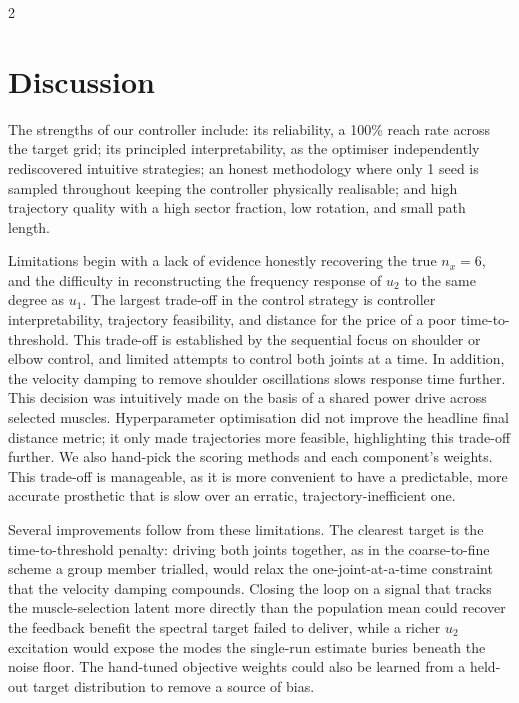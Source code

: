 \documentclass[a4paper, 10pt]{article}
\begin{document}
\begin{multicols*}{2}

  \section*{Discussion}

  The strengths of our controller include: its reliability, a 100\% reach rate
  across the target grid; its principled interpretability, as the optimiser
  independently rediscovered intuitive strategies; an honest methodology where
  only 1 seed is sampled throughout keeping the controller physically
  realisable; and high trajectory quality with a high sector fraction, low
  rotation, and small path length.

  Limitations begin with a lack of evidence honestly recovering the true
  $n_x=6$, and the difficulty in reconstructing the frequency response of $u_2$
  to the same degree as $u_1$. The largest trade-off in the control strategy is
  controller interpretability, trajectory feasibility, and distance for the price
  of a poor time-to-threshold. This trade-off is established by the sequential
  focus on shoulder or elbow control, and limited attempts to control both
  joints at a time. In addition, the velocity damping to remove shoulder
  oscillations slows response time further. This decision was intuitively made
  on the basis of a shared power drive across selected muscles. Hyperparameter
  optimisation did not improve the headline final distance metric; it only made
  trajectories more feasible, highlighting this trade-off further. We also
  hand-pick the scoring methods and each component's weights. This trade-off is
  manageable, as it is more convenient to have a predictable, more accurate
  prosthetic that is slow over an erratic, trajectory-inefficient one.

  Several improvements follow from these limitations. The clearest target is the
  time-to-threshold penalty: driving both joints together, as in the
  coarse-to-fine scheme a group member trialled, would relax the
  one-joint-at-a-time constraint that the velocity damping compounds. Closing the
  loop on a signal that tracks the muscle-selection latent more directly than the
  population mean could recover the feedback benefit the spectral target failed
  to deliver, while a richer $u_2$ excitation would expose the modes the
  single-run estimate buries beneath the noise floor. The hand-tuned objective
  weights could also be learned from a held-out target distribution to remove a
  source of bias.


\end{multicols*}
\end{document}
